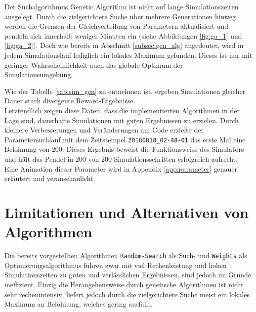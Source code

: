 	Der Suchalgorithmus Genetic Algorithm ist nicht auf lange Simulationszeiten ausgelegt. Durch die zielgerichtete Suche über mehrere Generationen hinweg werden die Grenzen der Gleichverteilung von Parametern aktualisiert und pendeln sich innerhalb weniger Minuten ein (siehe Abbildungen \ref{fig:ga_1} und \ref{fig:ga_2}). Doch wie bereits in Abschnitt \ref{subsec:gen_alg} angedeutet, wird in jedem Simulationslauf lediglich ein lokales Maximum gefunden. Dieses ist nur mit geringer Wahrscheinlichkeit auch das globale Optimum der Simulationsumgebung.
	\begin{table}[H]
		\centering
		\caption{Optimierung durch Algorithmus \texttt{Genetic\_Algorithm}.}
		\label{tab:sim_gen}
	\end{table}
	Wie der Tabelle \ref{tab:sim_gen} zu entnehmen ist, ergeben Simulationen gleicher Dauer stark divergente Reward-Ergebnisse.\\
	Letztendlich zeigen diese Daten, dass die implementierten Algorithmen in der Lage sind, dauerhafte Simulationen mit guten Ergebnissen zu erzielen. Durch kleinere Verbesserungen und Veränderungen am Code erzielte der Parametersuchlauf mit dem Zeitstempel \texttt{20180818\_02-48-01} das erste Mal eine Belohnung von 200. Dieses Ergebnis beweist die Funktionsweise des Simulators und hält das Pendel in 200 von 200 Simulationsschritten erfolgreich aufrecht. Eine Animation dieser Parameter wird in Appendix \ref{app:parameter} genauer erläutert und veranschaulicht.
	
\section{Limitationen und Alternativen von Algorithmen}
\label{sec:erg_lim}
	Die bereits vorgestellten Algorithmen \texttt{Random-Search} als Such- und \texttt{Weights} als Optimierungsalgorithmus führen zwar mit viel Rechenleistung und hohen Simulationszeiten zu guten und verlässlichen Ergebnissen, sind jedoch im Grunde ineffizient. Einzig die Herangehensweise durch genetische Algorithmen ist nicht sehr rechenintensiv, liefert jedoch durch die zielgerichtete Suche meist ein lokales Maximum an Belohnung, welches gering ausfällt.\\
